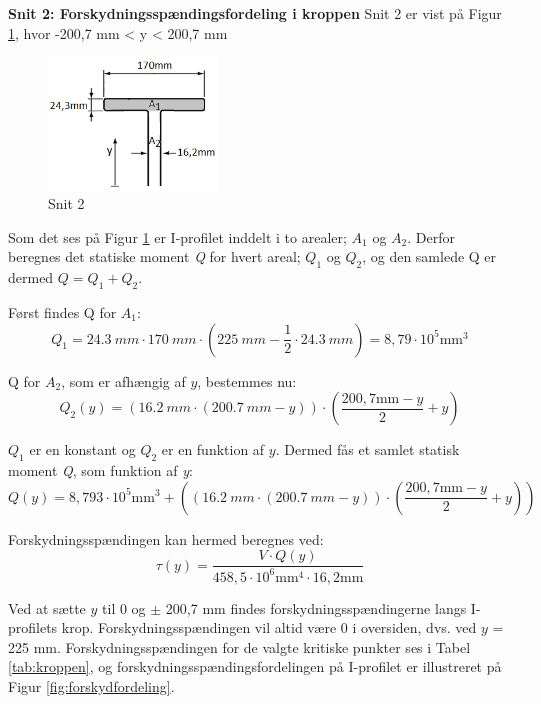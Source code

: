 \textbf{Snit 2: Forskydningsspændingsfordeling i kroppen}
\newline
Snit 2 er vist på Figur \ref{fig:snittoforskyd}, hvor -200,7 mm < y < 200,7 mm

\begin{figure}[H]
	\centering
	\includegraphics[width=0.4\textwidth]{billeder/snittoforskydning.png}
	\caption{Snit 2}
	\label{fig:snittoforskyd}
\end{figure}

Som det ses på Figur \ref{fig:snittoforskyd} er I-profilet inddelt i to arealer; $A_1$ og $A_2$. Derfor beregnes det statiske moment \textit{Q} for hvert areal; $Q_1$ og $Q_2$, og den samlede Q er dermed $Q = Q_1 + Q_2$. 

Først findes Q for $A_1$:
\begin{equation}
	Q_1 = \SI{24,3}{mm} \cdot \SI{170}{mm} \cdot (\SI{225}{mm} - \frac{1}{2} \cdot \SI{24,3}{mm}) = 8,\!79 \cdot 10^5 \text{mm}^3
\end{equation}

Q for $A_2$, som er afhængig af $y$, bestemmes nu:
\begin{equation}
Q_2(y) = (\SI{16,2}{mm} \cdot (\SI{200,7}{mm} -y)) \cdot (\frac{200,7 \text{mm} -y}{2} + y)
\end{equation}

$Q_1$ er en konstant og $Q_2$ er en funktion af $y$. Dermed fås et samlet statisk moment \textit{Q}, som funktion af \textit{y}:
\begin{equation}
	Q(y) = 8,\!793 \cdot 10^5 \text{mm}^3 + ((\SI{16,2}{mm} \cdot (\SI{200,7}{mm} -y)) \cdot (\frac{200,7 \text{mm} -y}{2} + y))
\end{equation}

Forskydningsspændingen kan hermed beregnes ved:
\begin{equation}
	\tau(y) = \frac{V \cdot Q(y)}{458,\!5 \cdot 10^6 \text{mm}^4 \cdot 16,\!2 \text{mm}}
\end{equation}

Ved at sætte $y$ til 0 og $\pm$ 200,7 mm findes forskydningsspændingerne langs I-profilets krop. Forskydningsspændingen vil altid være 0 i oversiden, dvs. ved $y$ = 225 mm. Forskydningsspændingen for de valgte kritiske punkter ses i Tabel \ref{tab:kroppen}, og forskydningsspændingsfordelingen på I-profilet er illustreret på Figur \ref{fig:forskydfordeling}. 

